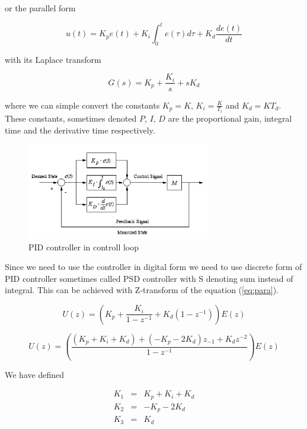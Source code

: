 \documentclass{article}
\begin{document}
\noindent or the parallel form

\begin{equation} \label{eq:para}
    u(t) =  K_pe(t) + K_i \int_0^t e(\tau)d\tau + K_d
        \frac{de(t)}{dt}\end{equation}

\noindent with its Laplace transform

\begin{equation}
    G(s) = K_p + \frac{K_i}{s} + sK_d
\end{equation}

\noindent where we can simple convert the constants $K_p = K$, $K_i =
\frac{K}{T_i}$ and $K_d = KT_d$. These constants, sometimes denoted $P$, $I$, $D$ are the proportional gain,
integral time and the derivative time respectively.

\begin{figure}[h]
    \centering
    \includegraphics[width=8cm]{pid}
    \caption{PID controller in controll loop \cite{pidpic}}
    \label{fig:pidpic}
\end{figure}

Since we need to use the controller in digital form we need to use discrete form
of PID controller sometimes called PSD controller with S denoting sum instead of
integral. This can be achieved with Z-transform of the equation (\ref{eq:para}).
\cite{zt}

\begin{equation}
    U(z) = \left( K_p + \frac{K_i}{1-z^{-1}} + K_d\left(1-z^{-1}\right) \right)E(z)
\end{equation}

\begin{equation} \label{eq:zpid}
    U(z) = \left( \frac{\left( K_p + K_i + K_d\right) + \left(
    -K_p-2K_d\right)z_{-1} + K_dz^{-2}}{1-z^{-1}} \right)E(z)
\end{equation}

\noindent We have defined

\begin{eqnarray*}
    K_1 &=& K_p + K_i + K_d \\
    K_2 &=& -K_p-2K_d \\
    K_3 &=& K_d
\end{eqnarray*}
\end{document}
